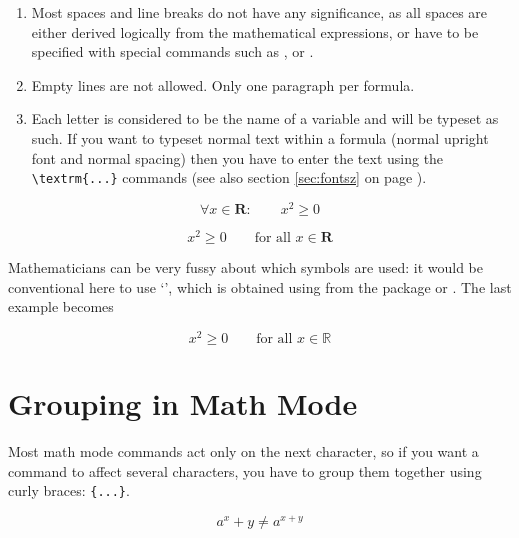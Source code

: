 \begin{enumerate}

\item Most spaces and line breaks do not have any significance, as all spaces
are either derived logically from the mathematical expressions, or
have to be specified with special commands such as \ci{,},  or
.
 
\item Empty lines are not allowed. Only one paragraph per formula.

\item Each letter is considered to be the name of a variable and will be
typeset as such. If you want to typeset normal text within a formula
(normal upright font and normal spacing) then you have to enter the
text using the \verb|\textrm{...}| commands (see also section \ref{sec:fontsz} on page \pageref{sec:fontsz}).
\end{enumerate}
\begin{example}
\begin{equation}
\forall x \in \mathbf{R}:
\qquad x^{2} \geq 0
\end{equation}
\end{example}
\begin{example}
\begin{equation}
x^{2} \geq 0\qquad
\textrm{for all }x\in\mathbf{R}
\end{equation}
\end{example}
 

%
%
Mathematicians can be very fussy about which symbols are used:
it would be conventional here to use `',
 which is obtained using  from the
package  or .
\ifx\mathbb\undefined\else
The last example becomes
\begin{example}
\begin{displaymath}
x^{2} \geq 0\qquad
\textrm{for all }x\in\mathbb{R}
\end{displaymath}
\end{example}
\fi

\section{Grouping in Math Mode}

Most math mode commands act only on the next character, so if you
want a command to affect several characters, you have to group them
together using curly braces: \verb|{...}|.
\begin{example}
\begin{equation}
a^x+y \neq a^{x+y}
\end{equation}
\end{example}
 
